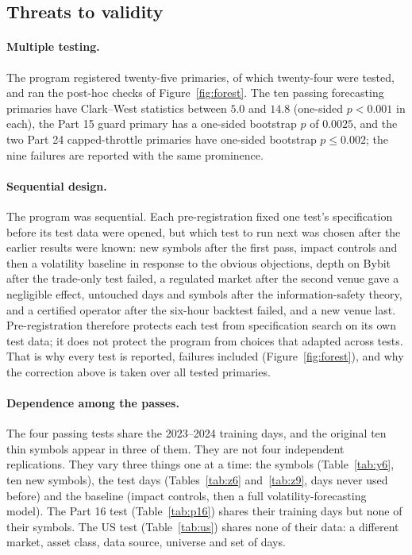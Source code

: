 \documentclass[12pt]{article}
\theoremstyle{definition}
\theoremstyle{remark}
\begin{document}
\subsection{Threats to validity}\label{sec:threats}
\paragraph{Multiple testing.} The program registered twenty-five primaries, of which twenty-four were tested, and ran the post-hoc checks of Figure~\ref{fig:forest}. The ten passing forecasting primaries have Clark--West statistics between $5.0$ and $14.8$ (one-sided $p<0.001$ in each), the Part 15 guard primary has a one-sided bootstrap $p$ of $0.0025$, and the two Part 24 capped-throttle primaries have one-sided bootstrap $p\le 0.002$; the nine failures are reported with the same prominence.

\paragraph{Sequential design.} The program was sequential. Each pre-registration fixed one test's specification before its test data were opened, but which test to run next was chosen after the earlier results were known: new symbols after the first pass, impact controls and then a volatility baseline in response to the obvious objections, depth on Bybit after the trade-only test failed, a regulated market after the second venue gave a negligible effect, untouched days and symbols after the information-safety theory, and a certified operator after the six-hour backtest failed, and a new venue last. Pre-registration therefore protects each test from specification search on its own test data; it does not protect the program from choices that adapted across tests. That is why every test is reported, failures included (Figure~\ref{fig:forest}), and why the correction above is taken over all tested primaries.

\paragraph{Dependence among the passes.} The four passing tests share the 2023--2024 training days, and the original ten thin symbols appear in three of them. They are not four independent replications. They vary three things one at a time: the symbols (Table~\ref{tab:y6}, ten new symbols), the test days (Tables~\ref{tab:z6} and~\ref{tab:z9}, days never used before) and the baseline (impact controls, then a full volatility-forecasting model). The Part 16 test (Table~\ref{tab:p16}) shares their training days but none of their symbols. The US test (Table~\ref{tab:us}) shares none of their data: a different market, asset class, data source, universe and set of days.
\end{document}
